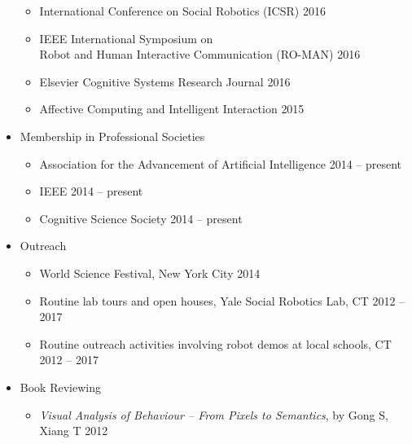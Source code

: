 \documentclass[10pt,letterpaper]{article}
\newcommand{\thing}[2]{{#1} \hfill {#2}}
\begin{document}
\begin{itemize}
\begin{itemize}
	\item \thing{International Conference on Social Robotics (ICSR)}{2016}
	\item \thing{IEEE International Symposium on \\ Robot and Human Interactive Communication (RO-MAN)}{2016}
	\item \thing{Elsevier Cognitive Systems Research Journal}{2016}
	\item \thing{Affective Computing and Intelligent Interaction}{2015}
	\end{itemize}
\item Membership in Professional Societies
	\begin{itemize}\setlength\itemsep{0em}
	\item\thing{ Association for the Advancement of Artificial Intelligence}{2014 -- present}
	\item \thing{IEEE}{2014 -- present}
	\item \thing{Cognitive Science Society}{2014 -- present}
	\end{itemize}
\item Outreach
	\begin{itemize}
	\item \thing{World Science Festival, New York City}{2014}
	\item \thing{Routine lab tours and open houses, Yale Social Robotics Lab, CT}{2012 -- 2017}
	\item \thing{Routine outreach activities involving robot demos at local schools, CT}{2012 -- 2017}
	\end{itemize}
\item Book Reviewing
	\begin{itemize}
	\item \thing{{\it Visual Analysis of Behaviour -- From Pixels to Semantics}, by Gong S, Xiang T}{2012}
	\end{itemize}
\end{itemize}
               
\end{document}
